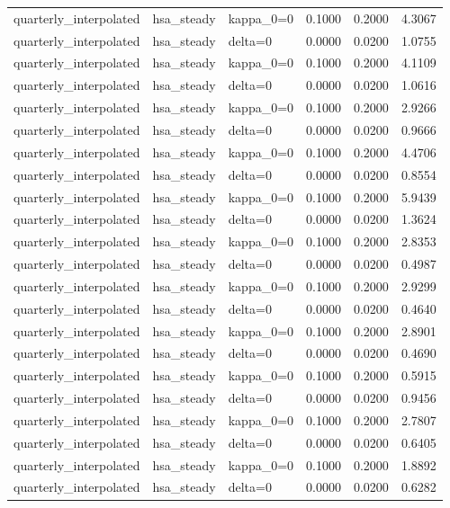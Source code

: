 \begin{tabular}{lllrrr}
quarterly\_interpolated & hsa\_steady & kappa\_0=0 & 0.1000 & 0.2000 & 4.3067 \\
quarterly\_interpolated & hsa\_steady & delta=0 & 0.0000 & 0.0200 & 1.0755 \\
quarterly\_interpolated & hsa\_steady & kappa\_0=0 & 0.1000 & 0.2000 & 4.1109 \\
quarterly\_interpolated & hsa\_steady & delta=0 & 0.0000 & 0.0200 & 1.0616 \\
quarterly\_interpolated & hsa\_steady & kappa\_0=0 & 0.1000 & 0.2000 & 2.9266 \\
quarterly\_interpolated & hsa\_steady & delta=0 & 0.0000 & 0.0200 & 0.9666 \\
quarterly\_interpolated & hsa\_steady & kappa\_0=0 & 0.1000 & 0.2000 & 4.4706 \\
quarterly\_interpolated & hsa\_steady & delta=0 & 0.0000 & 0.0200 & 0.8554 \\
quarterly\_interpolated & hsa\_steady & kappa\_0=0 & 0.1000 & 0.2000 & 5.9439 \\
quarterly\_interpolated & hsa\_steady & delta=0 & 0.0000 & 0.0200 & 1.3624 \\
quarterly\_interpolated & hsa\_steady & kappa\_0=0 & 0.1000 & 0.2000 & 2.8353 \\
quarterly\_interpolated & hsa\_steady & delta=0 & 0.0000 & 0.0200 & 0.4987 \\
quarterly\_interpolated & hsa\_steady & kappa\_0=0 & 0.1000 & 0.2000 & 2.9299 \\
quarterly\_interpolated & hsa\_steady & delta=0 & 0.0000 & 0.0200 & 0.4640 \\
quarterly\_interpolated & hsa\_steady & kappa\_0=0 & 0.1000 & 0.2000 & 2.8901 \\
quarterly\_interpolated & hsa\_steady & delta=0 & 0.0000 & 0.0200 & 0.4690 \\
quarterly\_interpolated & hsa\_steady & kappa\_0=0 & 0.1000 & 0.2000 & 0.5915 \\
quarterly\_interpolated & hsa\_steady & delta=0 & 0.0000 & 0.0200 & 0.9456 \\
quarterly\_interpolated & hsa\_steady & kappa\_0=0 & 0.1000 & 0.2000 & 2.7807 \\
quarterly\_interpolated & hsa\_steady & delta=0 & 0.0000 & 0.0200 & 0.6405 \\
quarterly\_interpolated & hsa\_steady & kappa\_0=0 & 0.1000 & 0.2000 & 1.8892 \\
quarterly\_interpolated & hsa\_steady & delta=0 & 0.0000 & 0.0200 & 0.6282 \\
\bottomrule
\end{tabular}
